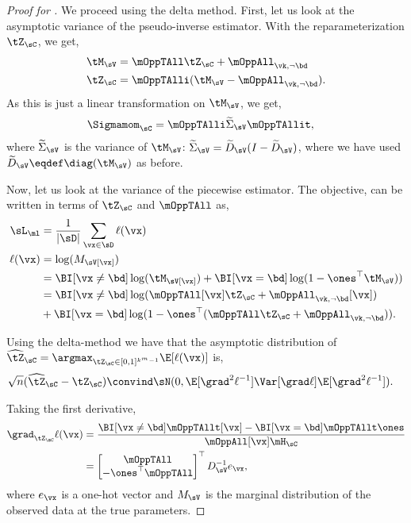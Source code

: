 \begin{proof}[Proof for ]
  We proceed using the delta method. First, let us look at the
  asymptotic variance of the pseudo-inverse estimator. With the
  reparameterization $\tZ_\sC$, we get,
  \begin{align*}
    \tM_\sV &= \mOppTAll \tZ_\sC + \mOppAll_{\vk,\neg \bd} \\
    \tZ_\sC &= \mOppTAlli (\tM_\sV - \mOppAll_{\vk, \neg \bd}).
  \end{align*}
  As this is just a linear transformation on $\tM_\sV$, we get,
  \begin{align*}
      \Sigmamom_{\sC} &= \mOppTAlli \widetilde\Sigma_\sV \mOppTAllit,
  \end{align*}
  where $\widetilde\Sigma_\sV$ is the variance of $\tM_\sV$: $\widetilde\Sigma_\sV = \widetilde{D}_\sV
  (I - \widetilde{D}_\sV)$, where we have used $\widetilde D_\sV \eqdef \diag(\tM_\sV)$ as
  before.

  Now, let us look at the variance of the piecewise estimator.  The
  objective,  can be written in terms of
  $\tZ_\sC$ and $\mOppTAll$ as,
  \begin{align*}
    \sL_\ml &= \frac{1}{|\sD|} \sum_{\vx \in \sD} \ell(\vx) \\
    \ell(\vx) 
              &= \log(M_\sV[\vx]) \\
              &= \BI[\vx \neq \bd] \log(\tM_\sV[\vx]) + \BI[\vx = \bd] \log(1 - \ones^\top \tM_\sV) ) \\
              &= \BI[\vx \neq \bd] \log(\mOppTAll[\vx] \tZ_\sC + \mOppAll_{\vk, \neg \bd}[\vx]) \\
              &+ \BI[\vx = \bd] \log(1 - \ones^\top (\mOppTAll \tZ_\sC + \mOppAll_{\vk, \neg \bd})).
  \end{align*}

Using the delta-method \cite{vaart98asymptotic} we have that the asymptotic distribution of 
  $\widehat{{\tZ}}_\sC = \argmax_{\tZ_\sC \in [0,1]^{k^m-1}} \E[\ell(\vx)]$ is,
  \begin{align*}
    \sqrt{n}(\widehat{{\tZ}}_{\sC} - {\tZ}_{\sC}) 
      &\convind \sN( 0, \E[\grad^2 \ell^{-1}] \Var[\grad \ell] \E[\grad^2 \ell^{-1}]).
  \end{align*}

Taking the first derivative,
\begin{align}
  \grad_{\tZ_\sC} \ell(\vx)
  &= 
  \frac{\BI[\vx \neq \bd] \mOppTAllt[\vx] - \BI[\vx = \bd] \mOppTAllt \ones}{\mOppAll[\vx] \mH_\sC} 
  \nonumber \\ 
  &= 
  \begin{bmatrix}
    \mOppTAll \\
    -\ones^\top \mOppTAll
  \end{bmatrix}^\top
  D_{\sV}^{-1} e_\vx, \label{eqn:lhood-grad}
\end{align}
where $e_\vx$ is a one-hot vector and $M_\sV$ is the marginal
distribution of the observed data at the true parameters.


\end{proof}
